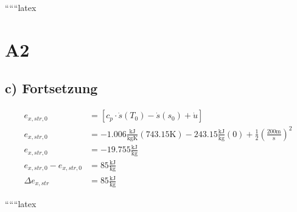 ``````latex

\section*{A2}
\subsection*{c) Fortsetzung}

\begin{align*}
    e_{x, str, 0} &= \left[ c_p \cdot \dot{s}(T_0) - \dot{s}(s_0) + \dot{u} \right] \\
    e_{x, str, 0} &= -1.006 \frac{\text{kJ}}{\text{kgK}} (743.15 \text{K}) - 243.15 \frac{\text{kJ}}{\text{kg}} (0) + \frac{1}{2} \left( \frac{200 \text{m}}{\text{s}} \right)^2 \\
    e_{x, str, 0} &= -19.755 \frac{\text{kJ}}{\text{kg}} \\
    e_{x, str, 0} - e_{x, str, 0} &= 85 \frac{\text{kJ}}{\text{kg}} \\
    \Delta e_{x, str} &= 85 \frac{\text{kJ}}{\text{kg}}
\end{align*}

``````latex


